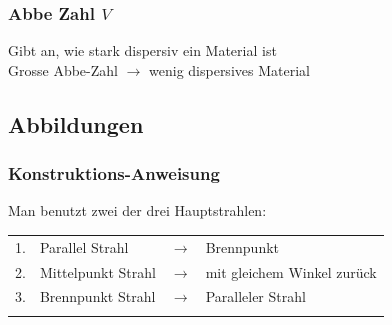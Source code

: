 \subsubsection{Abbe Zahl $V$}

Gibt an, wie stark dispersiv ein Material ist \\
Grosse Abbe-Zahl $\rightarrow$ wenig dispersives Material




\subsection{Abbildungen}

\subsubsection{Konstruktions-Anweisung}

Man benutzt zwei der drei Hauptstrahlen: \\

\begin{tabular}{l l c l}
1. & Parallel Strahl & $\rightarrow$ & Brennpunkt \\
2. & Mittelpunkt Strahl & $\rightarrow$ & mit gleichem Winkel zurück \\
3. & Brennpunkt Strahl & $\rightarrow$ & Paralleler Strahl \\
\\
\end{tabular}



